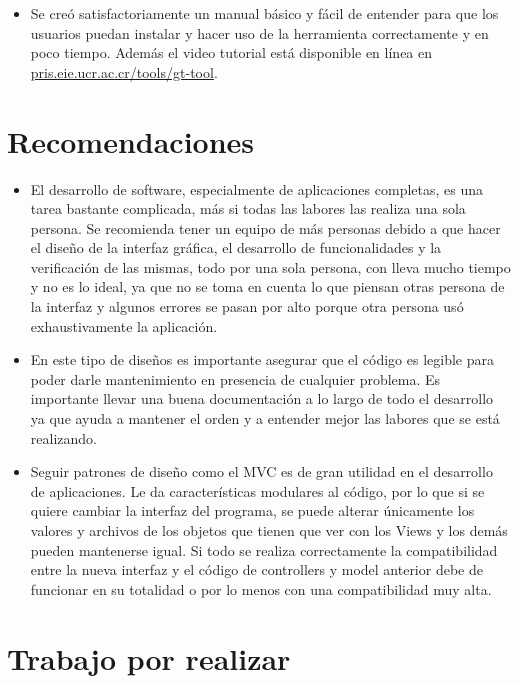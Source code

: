 \begin{itemize}
\item Se creó satisfactoriamente un manual básico y fácil de entender para que los usuarios puedan instalar y hacer uso de la herramienta correctamente y en poco tiempo. Además el video tutorial está disponible en línea en  \url{pris.eie.ucr.ac.cr/tools/gt-tool}.

\end{itemize}

\section*{Recomendaciones}

\begin{itemize}
	
	\item El desarrollo de software, especialmente de aplicaciones completas, es una tarea bastante complicada, más si todas las labores las realiza una sola persona. Se recomienda tener un equipo de más personas debido a que hacer el diseño de la interfaz gráfica, el desarrollo de funcionalidades y la verificación de las mismas, todo por una sola persona, con lleva mucho tiempo y no es lo ideal, ya que no se toma en cuenta lo que piensan otras persona de la interfaz y algunos errores se pasan por alto porque otra persona usó exhaustivamente la aplicación.
	
	\item En este tipo de diseños es importante asegurar que el código es legible para poder darle mantenimiento en presencia de cualquier problema. Es importante llevar una buena documentación a lo largo de todo el desarrollo ya que ayuda a mantener el orden y a entender mejor las labores que se está realizando.
	
	\item Seguir patrones de diseño como el MVC es de gran utilidad en el desarrollo de aplicaciones. Le da características modulares al código, por lo que si se quiere cambiar la interfaz del programa, se puede alterar únicamente los valores y archivos de los objetos que tienen que ver con los Views y los demás pueden mantenerse igual. Si todo se realiza correctamente la compatibilidad entre la nueva interfaz y el código de controllers y model anterior debe de funcionar en su totalidad o por lo menos con una compatibilidad muy alta.
	
\end{itemize}

\section*{Trabajo por realizar}


